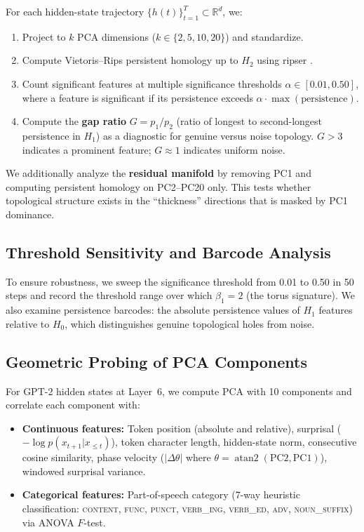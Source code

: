 \documentclass[11pt,a4paper]{article}
\begin{document}
For each hidden-state trajectory $\{h(t)\}_{t=1}^T \subset \mathbb{R}^d$, we:

\begin{enumerate}
    \item Project to $k$ PCA dimensions ($k \in \{2, 5, 10, 20\}$) and standardize.
    \item Compute Vietoris--Rips persistent homology up to $H_2$ using ripser \citep{tralie2018ripser}.
    \item Count significant features at multiple significance thresholds $\alpha \in [0.01, 0.50]$, where a feature is significant if its persistence exceeds $\alpha \cdot \max(\text{persistence})$.
    \item Compute the \textbf{gap ratio} $G = p_1 / p_2$ (ratio of longest to second-longest persistence in $H_1$) as a diagnostic for genuine versus noise topology. $G > 3$ indicates a prominent feature; $G \approx 1$ indicates uniform noise.
\end{enumerate}

We additionally analyze the \textbf{residual manifold} by removing PC1 and computing persistent homology on PC2--PC20 only. This tests whether topological structure exists in the ``thickness'' directions that is masked by PC1 dominance.

\subsection{Threshold Sensitivity and Barcode Analysis}

To ensure robustness, we sweep the significance threshold from 0.01 to 0.50 in 50 steps and record the threshold range over which $\beta_1 = 2$ (the torus signature). We also examine persistence barcodes: the absolute persistence values of $H_1$ features relative to $H_0$, which distinguishes genuine topological holes from noise.

\subsection{Geometric Probing of PCA Components}

For GPT-2 hidden states at Layer~6, we compute PCA with 10 components and correlate each component with:

\begin{itemize}
    \item \textbf{Continuous features:} Token position (absolute and relative), surprisal ($-\log p(x_{t+1} | x_{\leq t})$), token character length, hidden-state norm, consecutive cosine similarity, phase velocity ($|\Delta\theta|$ where $\theta = \operatorname{atan2}(\text{PC2}, \text{PC1})$), windowed surprisal variance.
    \item \textbf{Categorical features:} Part-of-speech category (7-way heuristic classification: \textsc{content}, \textsc{func}, \textsc{punct}, \textsc{verb\_ing}, \textsc{verb\_ed}, \textsc{adv}, \textsc{noun\_suffix}) via ANOVA $F$-test.
\end{itemize}
\end{document}
